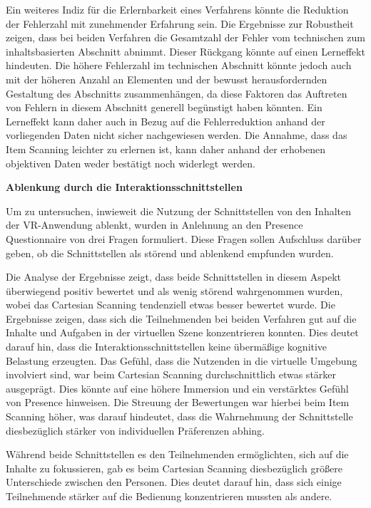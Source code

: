 Ein weiteres Indiz für die Erlernbarkeit eines Verfahrens könnte die Reduktion der Fehlerzahl mit zunehmender Erfahrung sein. Die Ergebnisse zur Robustheit zeigen, dass bei beiden Verfahren die Gesamtzahl der Fehler vom technischen zum inhaltsbasierten Abschnitt abnimmt. Dieser Rückgang könnte auf einen Lerneffekt hindeuten. Die höhere Fehlerzahl im technischen Abschnitt könnte jedoch auch mit der höheren Anzahl an Elementen und der bewusst herausfordernden Gestaltung des Abschnitts zusammenhängen, da diese Faktoren das Auftreten von Fehlern in diesem Abschnitt generell begünstigt haben könnten. Ein Lerneffekt kann daher auch in Bezug auf die Fehlerreduktion anhand der vorliegenden Daten nicht sicher nachgewiesen werden. 
Die Annahme, dass das Item Scanning leichter zu erlernen ist, kann daher anhand der erhobenen objektiven Daten weder bestätigt noch widerlegt werden.

\textbf{Ablenkung durch die Interaktionsschnittstellen}

Um zu untersuchen, inwieweit die Nutzung der Schnittstellen von den Inhalten der VR-Anwendung ablenkt, wurden in Anlehnung an den Presence Questionnaire von \citet{witmer_measuring_1998} drei Fragen formuliert. Diese Fragen sollen Aufschluss darüber geben, ob die Schnittstellen als störend und ablenkend empfunden wurden. 

Die Analyse der Ergebnisse zeigt, dass beide Schnittstellen in diesem Aspekt überwiegend positiv bewertet und als wenig störend wahrgenommen wurden, wobei das Cartesian Scanning tendenziell etwas besser bewertet wurde.
Die Ergebnisse zeigen, dass sich die Teilnehmenden bei beiden Verfahren gut auf die Inhalte und Aufgaben in der virtuellen Szene konzentrieren konnten. Dies deutet darauf hin, dass die Interaktionsschnittstellen keine übermäßige kognitive Belastung erzeugten. Das Gefühl, dass die Nutzenden in die virtuelle Umgebung involviert sind, war beim Cartesian Scanning durchschnittlich etwas stärker ausgeprägt. Dies könnte auf eine höhere Immersion und ein verstärktes Gefühl von Presence hinweisen. Die Streuung der Bewertungen war hierbei beim Item Scanning höher, was darauf hindeutet, dass die Wahrnehmung der Schnittstelle diesbezüglich stärker von individuellen Präferenzen abhing.

Während beide Schnittstellen es den Teilnehmenden ermöglichten, sich auf die Inhalte zu fokussieren, gab es beim Cartesian Scanning diesbezüglich größere Unterschiede zwischen den Personen. Dies deutet darauf hin, dass sich einige Teilnehmende stärker auf die Bedienung konzentrieren mussten als andere. 

